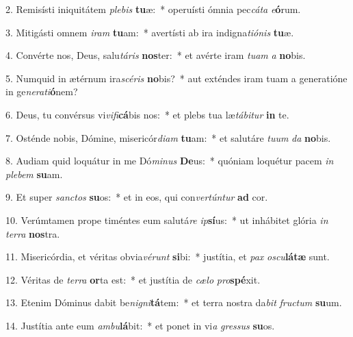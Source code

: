 2. Remisísti iniquitátem \textit{ple}\textit{bis} \textbf{tu}æ:~*  operuísti ómnia pec\textit{cá}\textit{ta} \textit{e}\textbf{ó}rum.\

3. Mitigásti omnem \textit{i}\textit{ram} \textbf{tu}am:~*  avertísti ab ira indigna\textit{ti}\textit{ó}\textit{nis} \textbf{tu}æ.\

4. Convérte nos, Deus, salu\textit{tá}\textit{ris} \textbf{nos}ter:~*  et avérte iram \textit{tu}\textit{am} \textit{a} \textbf{no}bis.\

5. Numquid in ætérnum ira\textit{scé}\textit{ris} \textbf{no}bis?~*  aut exténdes iram tuam a generatióne in ge\textit{ne}\textit{ra}\textit{ti}\textbf{ó}nem?\

6. Deus, tu convérsus vi\textit{vi}\textit{fi}\textbf{cá}bis nos:~*  et plebs tua læ\textit{tá}\textit{bi}\textit{tur} \textbf{in} te.\

7. Osténde nobis, Dómine, misericór\textit{di}\textit{am} \textbf{tu}am:~*  et salutáre \textit{tu}\textit{um} \textit{da} \textbf{no}bis.\

8. Audiam quid loquátur in me Dó\textit{mi}\textit{nus} \textbf{De}us:~*  quóniam loquétur pacem \textit{in} \textit{ple}\textit{bem} \textbf{su}am.\

9. Et super \textit{sanc}\textit{tos} \textbf{su}os:~*  et in eos, qui con\textit{ver}\textit{tún}\textit{tur} \textbf{ad} cor.\

10. Verúmtamen prope timéntes eum salutá\textit{re} \textit{ip}\textbf{sí}us:~*  ut inhábitet glória \textit{in} \textit{ter}\textit{ra} \textbf{nos}tra.\

11. Misericórdia, et véritas obvia\textit{vé}\textit{runt} \textbf{si}bi:~*  justítia, et \textit{pax} \textit{os}\textit{cu}\textbf{lá}\textbf{tæ} sunt.\

12. Véritas de \textit{ter}\textit{ra} \textbf{or}ta est:~*  et justítia de \textit{cæ}\textit{lo} \textit{pro}\textbf{spé}xit.\

13. Etenim Dóminus dabit be\textit{ni}\textit{gni}\textbf{tá}tem:~*  et terra nostra da\textit{bit} \textit{fruc}\textit{tum} \textbf{su}um.\

14. Justítia ante eum \textit{am}\textit{bu}\textbf{lá}bit:~*  et ponet in vi\textit{a} \textit{gres}\textit{sus} \textbf{su}os.\

